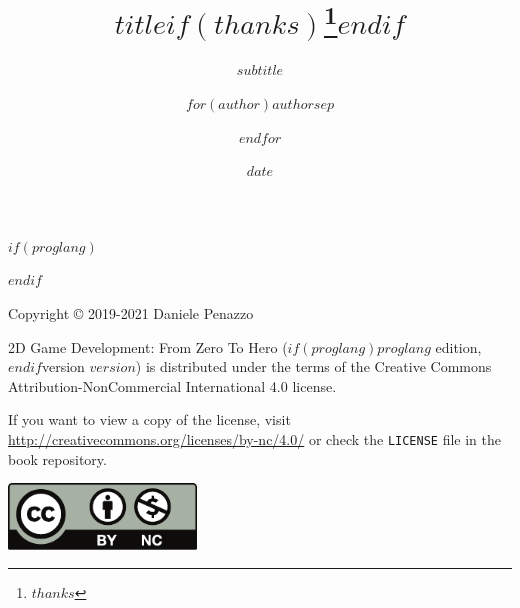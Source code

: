 \documentclass{article}
\title{$title$$if(thanks)$\thanks{$thanks$}$endif$}
\subtitle{$subtitle$}
\author{$for(author)$$author$$sep$ \and $endfor$}
\institute{$for(institute)$$institute$$sep$ \and $endfor$}
\date{$date$}
\begin{document}
\pagestyle{empty}
\begin{titlepage}
    \BgThispage
    $if(proglang)$
    \def \proglang{$proglang$}
    \def \langext{$lang_extension$}
    $endif$
    \null
    \newpage
\end{titlepage}

\clearpage
\null
Copyright © 2019-2021 Daniele Penazzo\\

\vspace{12pt}

2D Game Development: From Zero To Hero ($if(proglang)$$proglang$ edition, $endif$version $version$) is distributed under the terms of the Creative Commons Attribution-NonCommercial International 4.0 license.\\

\vspace{12pt}

If you want to view a copy of the license, visit \url{http://creativecommons.org/licenses/by-nc/4.0/} or check the \texttt{LICENSE} file in the book repository.

\vspace{24pt}

\includegraphics[width=50mm]{images/by-nc.pdf}
\end{document}
